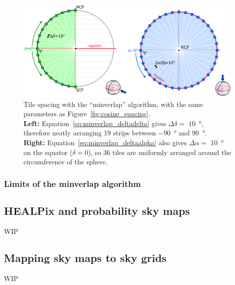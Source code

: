 \begin{colsection}
\begin{colsection}
\begin{figure}[p]
\begin{center}
\includegraphics[width=\linewidth]{images/spacing_minverlap.pdf}
\end{center}
\caption[Tile spacing with the ``minverlap'' algorithm]{Tile spacing with the ``minverlap'' algorithm, with the same parameters as Figure~\ref{fig:cosine_spacing}.
\\
\textbf{Left:} Equation~\ref{eq:minverlap_deltadelta} gives $\Delta\delta = $ \SI{10}{\degree}, therefore neatly arranging 19 strips between \SI{-90}{\degree} and \SI{90}{\degree}.
\\
\textbf{Right:} Equation~\ref{eq:minverlap_deltaalpha} also gives $\Delta\alpha = $ \SI{10}{\degree} on the equator ($\delta=0$), so 36 tiles are uniformly arranged around the circumference of the sphere.
}
\label{fig:minverlap_spacing}
\end{figure}

\newpage

\subsubsection{Limits of the minverlap algorithm}




\end{colsection}


\subsection{HEALPix and probability sky maps}
\label{sec:skymaps}
\begin{colsection}

WIP

\end{colsection}


\subsection{Mapping sky maps to sky grids}
\label{sec:mapping_skymaps}
\begin{colsection}

WIP

\end{colsection}


\end{colsection}

